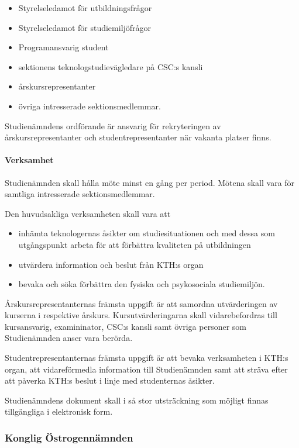 \documentclass[a4paper,12pt]{article}
\begin{document}
\begin{itemize}
  \item Styrelseledamot för utbildningsfrågor
  \item Styrelseledamot för studiemiljöfrågor
  \item Programansvarig student
  \item sektionens teknologstudievägledare på CSC:s kansli
  \item årskursrepresentanter
  \item övriga intresserade sektionsmedlemmar.
\end{itemize}

Studienämndens ordförande är ansvarig för rekryteringen av årskursrepresentanter och studentrepresentanter när vakanta platser finns.

\paragraph{Verksamhet}

Studienämnden skall hålla möte minst en gång per period. Mötena skall vara för samtliga intresserade sektionsmedlemmar.

Den huvudsakliga verksamheten skall vara att

\begin{itemize}
  \item inhämta teknologernas åsikter om studiesituationen och med dessa som utgångspunkt arbeta för att förbättra kvaliteten på utbildningen
  \item utvärdera information och beslut från KTH:s organ
  \item bevaka och söka förbättra den fysiska och psykosociala studiemiljön.
\end{itemize}

Årskursrepresentanternas främsta uppgift är att samordna utvärderingen av kurserna i respektive årskurs. Kursutvärderingarna skall vidarebefordras till kursansvarig, examininator, CSC:s kansli samt övriga personer som Studienämnden anser vara berörda.

Studentrepresentanternas främsta uppgift är att bevaka verksamheten i KTH:s organ, att vidareförmedla information till Studienämnden samt att sträva efter att påverka KTH:s beslut i linje med studenternas åsikter.

Studienämndens dokument skall i så stor utsträckning som möjligt finnas tillgängliga i elektronisk form.

\subsubsection{Konglig Östrogennämnden}
\end{document}
